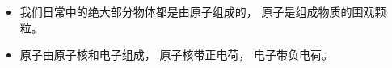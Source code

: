 
\begin{issues}
\issueDraft
\end{issues}

\begin{itemize}
\item 我们日常中的绝大部分物体都是由原子组成的， 原子是组成物质的围观颗粒。
\item 原子由原子核和电子组成， 原子核带正电荷， 电子带负电荷。
\end{itemize}
